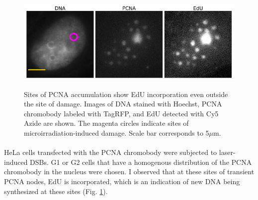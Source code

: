 \begin{figure}[htp]
    {\hfill\includegraphics[clip, width=1\linewidth]{figures/edu.png}\hspace*{\fill}}
    \caption{Sites of PCNA accumulation show EdU incorporation even outside the site of damage. Images of DNA stained with Hoechst, PCNA chromobody labeled with TagRFP, and EdU detected with Cy5 Azide are shown. The magenta circles indicate sites of microirradiation-induced damage. Scale bar corresponds to 5$\mu$m.}
    {\label{fig:edu}}
\end{figure}

\paragraph*{} HeLa cells transfected with the PCNA chromobody were subjected to laser-induced DSBs. G1 or G2 cells that have a homogenous distribution of the PCNA chromobody in the nucleus were chosen. I observed that at these sites of transient PCNA nodes, EdU is incorporated, which is an indication of new DNA being synthesized at these sites (Fig. \ref{fig:edu}). 

